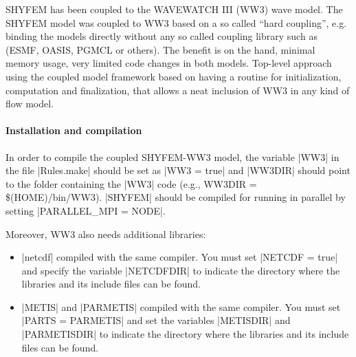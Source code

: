 
%
%
%
%
%
%
%

SHYFEM has been coupled to the WAVEWATCH III (WW3) wave model.
The SHYFEM model was coupled to WW3 based on a so called ``hard coupling'', e.g.
binding the models directly without any so called coupling library such as
(ESMF, OASIS, PGMCL or others). The benefit is on the hand, minimal memory
usage, very limited code changes in both models. Top-level approach using the
coupled model framework based on having a routine for initialization,
computation and finalization, that allows a neat inclusion of WW3 in any kind
of flow model.

\paragraph{Installation and compilation}

In order to compile the coupled SHYFEM-WW3 model, the variable |WW3| in the 
file |Rules.make| should be set as |WW3 = true| and |WW3DIR| should
point to the folder containing the |WW3| code (e.g., WW3DIR = \$(HOME)/bin/WW3). 
|SHYFEM| should be compiled for running in parallel by setting 
|PARALLEL_MPI = NODE|.

Moreover, WW3 also needs additional libraries:
\begin{itemize}
\item |netcdf| compiled with the same compiler.  You must set |NETCDF = true|
and specify the variable |NETCDFDIR| to indicate the directory where the 
libraries and its include files can be found.
\item |METIS| and |PARMETIS| compiled with the same compiler. You must set
|PARTS = PARMETIS| and set the variables |METISDIR| and |PARMETISDIR|
to indicate the directory where the libraries and its include files can be
found.
\end{itemize}

